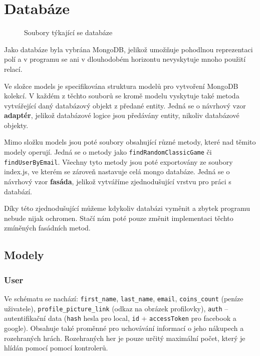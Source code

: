 \documentclass[a4paper,oneside,12pt]{report}
\begin{document}
\section{Databáze}

\begin{figure}[H]
   \caption[Soubory týkající se databáze]{Soubory týkající se databáze}
   \label{fig:sqlClasses}
\end{figure}

Jako databáze byla vybrána MongoDB, jelikož umožňuje pohodlnou reprezentaci polí a v programu se ani v dlouhodobém horizontu nevyskytuje mnoho použití relací. 

Ve složce models je specifikována struktura modelů pro vytvoření MongoDB kolekcí. V každém z těchto souborů se kromě modelu vyskytuje také metoda vytvářející daný databázový objekt z předané entity. Jedná se o návrhový vzor \textbf{adaptér}, jelikož databázové logice jsou předávány entity, nikoliv databázové objekty.

Mimo složku models jsou poté soubory obsahující různé metody, které nad těmito modely operují. Jedná se o metody jako \texttt{findRandomClassicGame} či \texttt{findUserByEmail}. Všechny tyto metody jsou poté exportovány ze soubory index.js, ve kterém se zároveň nastavuje celá mongo databáze. Jedná se o návrhový vzor \textbf{fasáda}, jelikož vytváříme zjednodušující vrstvu pro práci s databází.

Díky této zjednodušující můžeme kdykoliv databázi vyměnit a zbytek programu nebude nijak ochromen. Stačí nám poté pouze změnit implementaci těchto zmíněných fasádních metod.

\subsection{Modely}

\subsubsection{User}
Ve schématu se nachází: \texttt{first\_name}, \texttt{last\_name}, \texttt{email}, \texttt{coins\_count} (peníze uživatele), \texttt{profile\_picture\_link} (odkaz na obrázek profilovky), \texttt{auth} -- autentifikační data (\texttt{hash} hesla pro local, \texttt{id} + \texttt{accessToken} pro facebook a google). Obsahuje také proměnné pro uchovávání informací o jeho nákupech a rozehraných hrách. Rozehraných her je pouze určitý maximální počet, který je hlídán pomocí pomocí kontrolerů.
\end{document}
